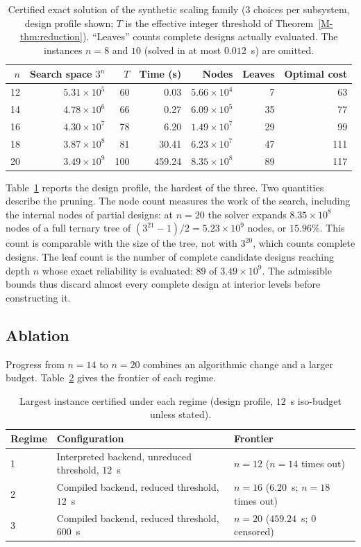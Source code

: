\documentclass[11pt]{article}
\begin{document}
\begin{table}[!htbp]
\centering
\caption{Certified exact solution of the synthetic scaling family ($3$ choices per subsystem, design
profile shown; $T$ is the effective integer threshold of Theorem~\ref*{M-thm:reduction}). ``Leaves'' counts complete
designs actually evaluated. The instances $n=8$ and $10$ (solved in at most $0.012$~s) are omitted.}
\label{tab:scaling}
\small
\begin{tabular}{rrrrrrr}
\hline
$n$ & Search space $3^n$ & $T$ & Time (s) & Nodes & Leaves & Optimal cost\\
\hline
12 & $5.31\times10^{5}$ & 60 & 0.03 & $5.66\times10^{4}$ & 7 & 63\\
14 & $4.78\times10^{6}$ & 66 & 0.27 & $6.09\times10^{5}$ & 35 & 77\\
16 & $4.30\times10^{7}$ & 78 & 6.20 & $1.49\times10^{7}$ & 29 & 99\\
18 & $3.87\times10^{8}$ & 81 & 30.41 & $6.23\times10^{7}$ & 47 & 111\\
20 & $3.49\times10^{9}$ & 100 & 459.24 & $8.35\times10^{8}$ & 89 & 117\\
\hline
\end{tabular}
\end{table}

Table~\ref{tab:scaling} reports the design profile, the hardest of the three. Two quantities describe
the pruning. The node count measures the work of the search, including the internal nodes of partial
designs: at $n=20$ the solver expands $8.35\times10^{8}$ nodes of a full ternary tree of
$(3^{21}-1)/2 = 5.23\times10^{9}$ nodes, or $15.96\%$. This count is comparable with the size of the
tree, not with $3^{20}$, which counts complete designs. The leaf count is the number of complete candidate designs reaching depth $n$ whose exact reliability is evaluated: $89$ of $3.49\times10^{9}$. The admissible bounds thus discard almost every complete design at interior levels before constructing it.

\subsection{Ablation}
Progress from $n=14$ to $n=20$ combines an algorithmic change and a larger budget.
Table~\ref{tab:ablation} gives the frontier of each regime.

\begin{table}[!htbp]
\centering
\caption{Largest instance certified under each regime (design profile, $12$~s iso-budget unless stated).}
\label{tab:ablation}
\small
\begin{tabular}{lll}
\hline
Regime & Configuration & Frontier\\
\hline
1 & Interpreted backend, unreduced threshold, $12$~s & $n = 12$ ($n=14$ times out)\\
2 & Compiled backend, reduced threshold, $12$~s & $n = 16$ ($6.20$~s; $n=18$ times out)\\
3 & Compiled backend, reduced threshold, $600$~s & $n = 20$ ($459.24$~s; $0$ censored)\\
\hline
\end{tabular}
\end{table}
\end{document}
